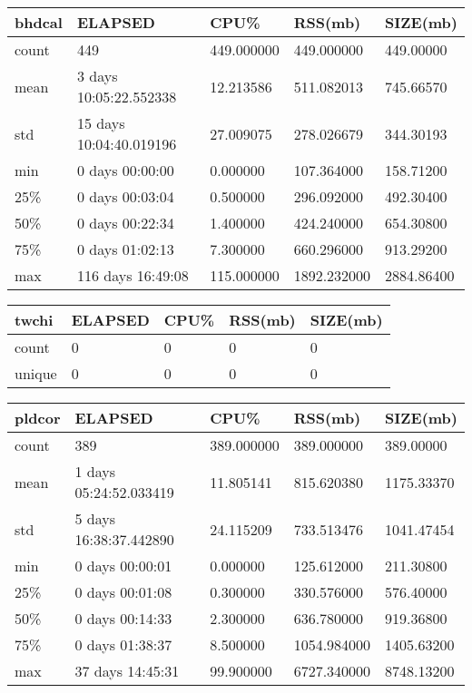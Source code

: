 \documentclass{article}
\begin{document}
\begin{tabular}{|l|l|l|l|l|}
\hline 
\hline bhdcal&    ELAPSED&   CPU\%&  RSS(mb)&   SIZE(mb) \\
\hline count&   449& 449.000000&  449.000000&  449.00000 \\
\hline mean&  3 days 10:05:22.552338&  12.213586&  511.082013&  745.66570 \\
\hline std&  15 days 10:04:40.019196&  27.009075&  278.026679&  344.30193 \\
\hline min&   0 days 00:00:00&  0.000000&  107.364000&  158.71200 \\
\hline 25\%&   0 days 00:03:04&  0.500000&  296.092000&  492.30400 \\
\hline 50\%&   0 days 00:22:34&  1.400000&  424.240000&  654.30800 \\
\hline 75\%&   0 days 01:02:13&  7.300000&  660.296000&  913.29200 \\
\hline max&  116 days 16:49:08& 115.000000& 1892.232000& 2884.86400 \\
\hline 
\end{tabular}
 
\begin{tabular}{|l|l|l|l|l|}
\hline 
\hline twchi& ELAPSED& CPU\%& RSS(mb)& SIZE(mb) \\
\hline count&    0&   0&   0& 0    \\
\hline unique&   0&   0&   0& 0    \\
\hline 
\end{tabular}
 
\begin{tabular}{|l|l|l|l|l|}
\hline 
\hline pldcor& ELAPSED&   CPU\%&  RSS(mb)&   SIZE(mb) \\
\hline count&    389& 389.000000&  389.000000&  389.00000 \\
\hline mean&  1 days 05:24:52.033419&  11.805141&  815.620380& 1175.33370 \\
\hline std&  5 days 16:38:37.442890&  24.115209&  733.513476& 1041.47454 \\
\hline min&   0 days 00:00:01&  0.000000&  125.612000&  211.30800 \\
\hline 25\%&   0 days 00:01:08&  0.300000&  330.576000&  576.40000 \\
\hline 50\%&   0 days 00:14:33&  2.300000&  636.780000&  919.36800 \\
\hline 75\%&   0 days 01:38:37&  8.500000& 1054.984000& 1405.63200 \\
\hline max&  37 days 14:45:31&  99.900000& 6727.340000& 8748.13200 \\
\hline 
\end{tabular}
 
\end{document}
